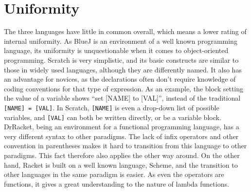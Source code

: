 \section{Uniformity}
\label{sec:uniformity}

The three languages have little in common overall, which means a lower rating of internal uniformity. As BlueJ is an environment of a well known programming language, its uniformity is unquestionable when it comes to object-oriented programming. Scratch is very simplistic, and its basic constructs are similar to those in widely used languages, although they are differently named. It also has an advantage for novices, as the declarations often don't require knowledge of coding conventions for that type of expression. As an example, the block setting the value of a variable shows ``set [NAME] to [VAL]'', instead of the traditional \lstinline![NAME] = [VAL]!. In Scratch, \lstinline![NAME]! is even a drop-down list of possible variables, and \lstinline![VAL]! can both be written directly, or be a variable block. DrRacket, being an environment for a functional programming language, has a very different syntax to other paradigms. The lack of infix operators and other convention in parentheses makes it hard to transition from this language to other paradigms. This fact therefore also applies the other way around. On the other hand, Racket is built on a well known language, Scheme, and the transition to other languages in the same paradigm is easier. As even the operators are functions, it gives a great understanding to the nature of lambda functions.